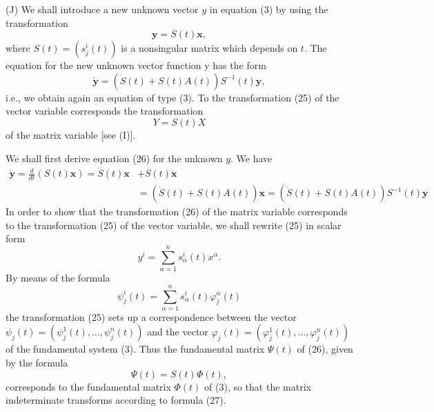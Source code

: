 \documentclass[10pt,a5paper]{book}
\theoremstyle{plain}
\theoremstyle{definition}
\theoremstyle{remark}
\begin{document}
(J) We shall introduce a new unknown vector $y$ in equation (3) by using the transformation
\begin{equation*}
\mathbf{y}=S(t) \mathbf{x}, \tag{25}
\end{equation*}
where $S(t)=\left(s_{j}^{i}(t)\right)$ is a nonsingular matrix which depends on $t$. The equation for the new unknown vector function y has the form
\begin{equation*}
\dot{\mathbf{y}}=(\dot{S}(t)+S(t) A(t)) S^{-1}(t) \mathbf{y}, \tag{26}
\end{equation*}
i.e., we obtain again an equation of type (3). To the transformation (25) of the vector variable corresponds the transformation
\begin{equation*}
Y=S(t) X \tag{27}
\end{equation*}
of the matrix variable [see (I)].

We shall first derive equation (26) for the unknown $y$. We have
\[
\begin{aligned}
\dot{\mathbf{y}}=\frac{d}{d t}(S(t) \mathbf{x})=\dot{S}(t) \mathbf{x} & +S(t) \dot{\mathbf{x}} \\
& =(\dot{S}(t)+S(t) A(t)) \mathbf{x}=(\dot{S}(t)+S(t) A(t)) S^{-1}(t) \mathbf{y}
\end{aligned}
\]
In order to show that the transformation (26) of the matrix variable corresponds to the transformation (25) of the vector variable, we shall rewrite (25) in scalar form
\[
y^{i}=\sum_{\alpha=1}^{n} s_{\alpha}^{i}(t) x^{\alpha} .
\]
By means of the formula
\[
\psi_{j}^{i}(t)=\sum_{\alpha=1}^{n} s_{\alpha}^{i}(t) \varphi_{j}^{\alpha}(t)
\]
the transformation (25) sets up a correspondence between the vector $\psi_{j}(t)=\left(\psi_{j}^{1}(t), \ldots, \psi_{j}^{n}(t)\right)$ and the vector $\varphi_{j}(t)=\left(\varphi_{j}^{1}(t), \ldots, \varphi_{j}^{n}(t)\right)$ of the fundamental system (3). Thus the fundamental matrix $\Psi(t)$ of (26), given by the formula
\[
\Psi(t)=S(t) \Phi(t),
\]
corresponds to the fundamental matrix $\Phi(t)$ of (3), so that the matrix indeterminate transforms according to formula (27).
\end{document}
